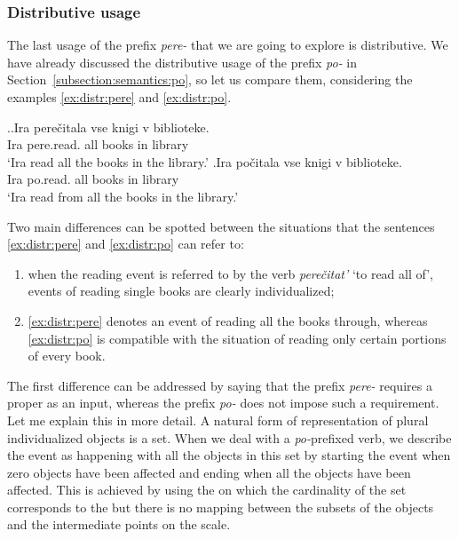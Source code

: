 \subsubsection{Distributive usage}
The last usage of the prefix \textit{pere-} that we are going to explore is distributive. We have already discussed the distributive usage of the prefix \textit{po-} in Section~\ref{subsection:semantics:po}, so let us compare them, considering the examples \ref{ex:distr:pere} and \ref{ex:distr:po}.

\ex.\ag.\label{ex:distr:pere}Ira pere\v{c}itala vse knigi v biblioteke.\\
Ira pere.read. all books in library\\
\trans `Ira read all the books in the library.'
\bg.\label{ex:distr:po}Ira po\v{c}itala vse knigi v biblioteke.\\
Ira po.read. all books in library\\
\trans `Ira read from all the books in the library.'

Two main differences can be spotted between the situations that the sentences \ref{ex:distr:pere} and \ref{ex:distr:po} can refer to:
\begin{enumerate}
\item when the reading event is referred to by the verb \textit{pere\v{c}itat'} `to read all of', events of reading single books are clearly individualized;
\item \ref{ex:distr:pere} denotes an event of reading all the books through, whereas \ref{ex:distr:po} is compatible with the situation of reading only certain portions of every book.
\end{enumerate}

The first difference can be addressed by saying that the prefix \textit{pere-} requires a proper  as an input, whereas the prefix \textit{po-} does not impose such a requirement. Let me explain this in more detail. A natural form of representation of plural individualized objects is a set. When we deal with a \textit{po-}prefixed verb, we describe the event as happening with all the objects in this set by starting the event when zero objects have been affected and ending when all the objects have been affected. This is achieved by using the  on which the cardinality of the set corresponds to the  but there is no mapping between the subsets of the objects and the intermediate points on the scale.

